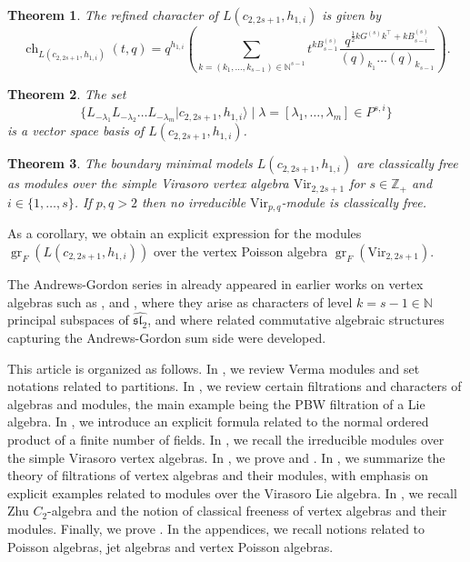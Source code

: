 \documentclass[a4paper, 12pt, reqno]{amsart}
\newtheorem{theorem}{Theorem}[section]
\theoremstyle{remark}
\DeclareMathOperator{\ch}{ch}
\DeclareMathOperator{\gr}{gr}
\newcommand{\Vir}{{\mathrm{Vir}}}
\begin{document}
\begin{theorem}
  \label{thr:1}
  The refined character of $L(c_{2, 2s + 1}, h_{1, i})$ is given by
  \begin{equation*}
    \ch_{L(c_{2, 2s + 1}, h_{1, i})}(t, q) = q^{h_{1, i}}\left(\sum_{k = (k_1, \dots, k_{s - 1}) \in \mathbb{N}^{s - 1}}t^{kB^{(s)}_{s - 1}}\frac{q^{\frac{1}{2}kG^{(s)}k^\top + kB^{(s)}_{s - i}}}{(q)_{k_1}\dots(q)_{k_{s - 1}}}\right).
  \end{equation*}
\end{theorem}

\begin{theorem}
  \label{thr:2}
  The set
  \begin{equation*}
    \{L_{-\lambda_1}L_{-\lambda_2}\dots L_{-\lambda_m}|c_{2, 2s + 1}, h_{1, i}\rangle \mid \lambda = [\lambda_1, \dots, \lambda_m] \in P^{s, i}\}
  \end{equation*}
  is a vector space basis of $L(c_{2, 2s + 1}, h_{1, i})$.
\end{theorem}

\begin{theorem}
  \label{thr:3}
  The boundary minimal models $L(c_{2, 2s + 1}, h_{1, i})$ are classically free as modules over the simple Virasoro vertex algebra $\Vir_{2, 2s + 1}$ for $s \in \mathbb{Z}_+$ and $i \in \{1, \dots, s\}$.
  If $p, q > 2$ then no irreducible $\Vir_{p, q}$-module is classically free.
\end{theorem}
As a corollary, we obtain an explicit expression for the modules $\gr_F(L(c_{2, 2s + 1}, h_{1, i}))$ over the vertex Poisson algebra $\gr_F(\Vir_{2, 2s + 1})$.

The Andrews-Gordon series in  already appeared in earlier works on vertex algebras such as \cite{feigin_quasi-particles_1993}, \cite{capparelli_rogersselberg_2006} and \cite{calinescu_vertex-algebraic_2008}, where they arise as characters of level $k = s - 1 \in \mathbb{N}$ principal subspaces of $\widehat{\mathfrak{sl}_2}$, and where related commutative algebraic structures capturing the Andrews-Gordon sum side were developed.

This article is organized as follows.
In , we review Verma modules and set notations related to partitions.
In , we review certain filtrations and characters of algebras and modules, the main example being the PBW filtration of a Lie algebra.
In , we introduce an explicit formula related to the normal ordered product of a finite number of fields.
In , we recall the irreducible modules over the simple Virasoro vertex algebras.
In , we prove  and .
In , we summarize the theory of filtrations of vertex algebras and their modules, with emphasis on explicit examples related to modules over the Virasoro Lie algebra.
In , we recall Zhu $C_2$-algebra and the notion of classical freeness of vertex algebras and their modules.
Finally, we prove .
In the appendices, we recall notions related to Poisson algebras, jet algebras and vertex Poisson algebras.
\end{document}
